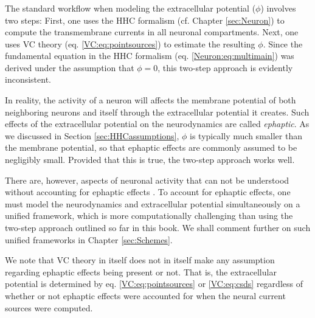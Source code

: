 \subsubsection{ }
\label{sec:noephaptic}
The standard workflow when modeling the extracellular potential ($\phi$) involves two steps: First, one uses the HHC formalism (cf. Chapter \ref{sec:Neuron}) to compute the transmembrane currents in all neuronal compartments. Next, one uses VC theory (eq. \ref{VC:eq:pointsources}) to estimate the resulting $\phi$. Since the fundamental equation in the HHC formalism (eq. \ref{Neuron:eq:multimain}) was derived under the assumption that $\phi=0$, this two-step approach is evidently inconsistent. 

In reality, the activity of a neuron will affects the membrane potential of both neighboring neurons and itself through the extracellular potential it creates. Such effects of the extracellular potential on the neurodynamics are called \textit{ephaptic}. As we discussed in Section \ref{sec:HHCassumptions}, $\phi$ is typically much smaller than the membrane potential, so that ephaptic effects are commonly assumed to be negligibly small. Provided that this is true, the two-step approach works well. 

There are, however, aspects of neuronal activity that can not be understood without accounting for ephaptic effects \citep{Holt1999, anastassiou2015, Goldwyn2016}. To account for ephaptic effects, one must model the neurodynamics and extracellular potential simultaneously on a unified framework, which is more computationally challenging than using the two-step approach outlined so far in this book. We shall comment further on such unified frameworks in Chapter \ref{sec:Schemes}.

We note that VC theory in itself does not in itself make any assumption regarding ephaptic effects being present or not. That is, the extracellular potential is determined by eq. \ref{VC:eq:pointsources} or \ref{VC:eq:csds} regardless of whether or not ephaptic effects were accounted for when the neural current sources were computed. 




